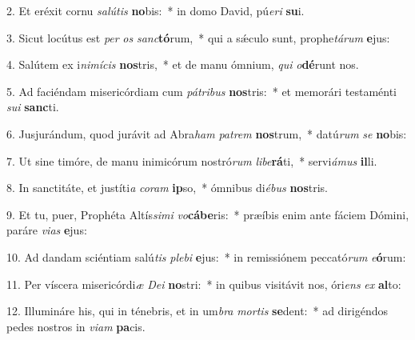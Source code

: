 ﻿2. Et eréxit cornu \textit{sa}\textit{lú}\textit{tis} \textbf{no}bis:~* in domo David, pú\textit{e}\textit{ri} \textbf{su}i.

3. Sicut locútus est \textit{per} \textit{os} \textit{sanc}\textbf{tó}rum,~* qui a sǽculo sunt, prophe\textit{tá}\textit{rum} \textbf{e}jus:

4. Salútem ex i\textit{ni}\textit{mí}\textit{cis} \textbf{nos}tris,~* et de manu ómnium, \textit{qui} \textit{o}\textbf{dé}runt nos.

5. Ad faciéndam misericórdiam cum \textit{pá}\textit{tri}\textit{bus} \textbf{nos}tris:~* et memorári testaménti \textit{su}\textit{i} \textbf{sanc}ti.

6. Jusjurándum, quod jurávit ad Abra\textit{ham} \textit{pa}\textit{trem} \textbf{nos}trum,~* datú\textit{rum} \textit{se} \textbf{no}bis:

7. Ut sine timóre, de manu inimicórum nostró\textit{rum} \textit{li}\textit{be}\textbf{rá}ti,~* servi\textit{á}\textit{mus} \textbf{il}li.

8. In sanctitáte, et justíti\textit{a} \textit{co}\textit{ram} \textbf{ip}so,~* ómnibus di\textit{é}\textit{bus} \textbf{nos}tris.

9. Et tu, puer, Prophéta Altís\textit{si}\textit{mi} \textit{vo}\textbf{cá}\textbf{be}ris:~* præíbis enim ante fáciem Dómini, paráre \textit{vi}\textit{as} \textbf{e}jus:

10. Ad dandam sciéntiam salú\textit{tis} \textit{ple}\textit{bi} \textbf{e}jus:~* in remissiónem peccató\textit{rum} \textit{e}\textbf{ó}rum:

11. Per víscera misericórdi\textit{æ} \textit{De}\textit{i} \textbf{no}stri:~* in quibus visitávit nos, óri\textit{ens} \textit{ex} \textbf{al}to:

12. Illumináre his, qui in ténebris, et in um\textit{bra} \textit{mor}\textit{tis} \textbf{se}dent:~* ad dirigéndos pedes nostros in \textit{vi}\textit{am} \textbf{pa}cis.
